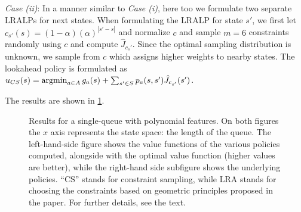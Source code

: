 \documentclass[12pt,draftcls,onecolumn]{IEEEtran}
\begin{document}
\emph{Case (ii)}: In a manner similar to \emph{Case (i)}, here too we formulate two separate LRALPs for next states. When formulating the LRALP for state $s'$, we first let $c_{s'}(s)=(1-\alpha)(\alpha)^{|s'-s|}$  and normalize $c$ and sample $m=6$ constraints randomly using $c$ and compute $\hat{J}_{c_s'}$. Since the optimal sampling distribution is unknown, we sample from $c$ which assigns higher weights to nearby states.
The lookahead policy is formulated as
$u_{CS}(s)=\operatorname{argmin}_{a\in A} g_a(s)+\sum_{s'\in S}p_a(s,s')\hat{J}_{c_{s'}}(s')$.

The results are shown in \cref{fig:results}.
\FloatBarrier
\begin{figure}[htp]
\begin{center}
\begin{minipage}{0.7\textwidth}
\end{minipage}
\end{center}
\caption{Results for a single-queue with polynomial features. 
On both figures the $x$ axis represents the state space: the length of the queue.
The left-hand-side figure shows the value functions
of the various policies computed, alongside with the optimal value function (higher values are better), while
the right-hand side subfigure shows the underlying policies.
``CS'' stands for constraint sampling, while LRA stands for choosing the constraints based on 
geometric principles proposed in the paper. For further details, see the text.
}
\label{fig:results}
\end{figure}
\end{document}
